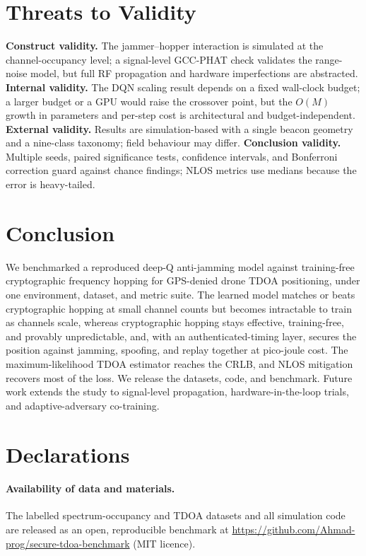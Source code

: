 \documentclass[11pt]{article}
\begin{document}
\section{Threats to Validity}\label{sec:threats}
\textbf{Construct validity.} The jammer--hopper interaction is simulated at the
channel-occupancy level; a signal-level GCC-PHAT check validates the range-noise
model, but full RF propagation and hardware imperfections are abstracted.
\textbf{Internal validity.} The DQN scaling result depends on a fixed
wall-clock budget; a larger budget or a GPU would raise the crossover point, but
the $O(M)$ growth in parameters and per-step cost is architectural and
budget-independent. \textbf{External validity.} Results are simulation-based
with a single beacon geometry and a nine-class taxonomy; field behaviour may
differ. \textbf{Conclusion validity.} Multiple seeds, paired significance tests,
confidence intervals, and Bonferroni correction guard against chance findings;
NLOS metrics use medians because the error is heavy-tailed.

\section{Conclusion}\label{sec:conclusion}
We benchmarked a reproduced deep-Q anti-jamming model against training-free
cryptographic frequency hopping for GPS-denied drone TDOA positioning, under one
environment, dataset, and metric suite. The learned model matches or beats
cryptographic hopping at small channel counts but becomes intractable to train
as channels scale, whereas cryptographic hopping stays effective, training-free,
and provably unpredictable, and, with an authenticated-timing layer, secures the
position against jamming, spoofing, and replay together at pico-joule cost. The
maximum-likelihood TDOA estimator reaches the CRLB, and NLOS mitigation recovers
most of the loss. We release the datasets, code, and benchmark. Future work
extends the study to signal-level propagation, hardware-in-the-loop trials, and
adaptive-adversary co-training.

\section*{Declarations}\label{sec:avail}
\paragraph{Availability of data and materials.}
The labelled spectrum-occupancy and TDOA datasets and all simulation code are
released as an open, reproducible benchmark at
\url{https://github.com/Ahmad-prog/secure-tdoa-benchmark} (MIT licence).
\end{document}
